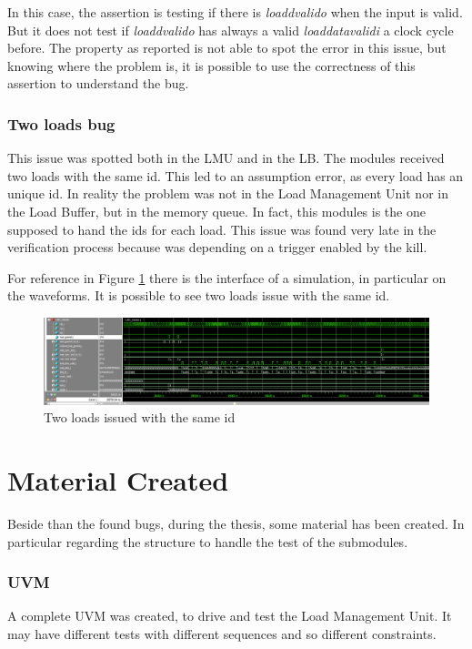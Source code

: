 In this case, the assertion is testing if there is \emph{load\+dvalid\+o} when the input is valid. But it does not test if \emph{load\+dvalid\+o} has always a valid \emph{load\+data\+valid\+i} a clock cycle before.
The property as reported is not able to spot the error in this issue, but knowing where the problem is, it is possible to use the correctness of this assertion to understand the bug.

\subsubsection{Two loads bug}
This issue was spotted both in the LMU and in the LB. The modules received two loads with the same id. This led to an assumption error, as every load has an unique id.
In reality the problem was not in the Load Management Unit nor in the Load Buffer, but in the memory queue. In fact, this modules is the one supposed to hand the ids for each load.
This issue was found very late in the verification process because was depending on a trigger enabled by the kill.

For reference in Figure \ref{2-loads} there is the interface of a simulation, in particular on the waveforms. It is possible to see two loads issue with the same id.

\begin{figure}[H]
    \centering
    \includegraphics[scale = 0.25]{Chapter_3/img/2-loads.png}
    \caption{Two loads issued with the same id}
    \label{2-loads}
\end{figure}


\section{Material Created}
Beside than the found bugs, during the thesis, some material has been created.
In particular regarding the structure to handle the test of the submodules.

\subsubsection{UVM}
A complete UVM was created, to drive and test the Load Management Unit. It may have different tests with different sequences and so different constraints.

